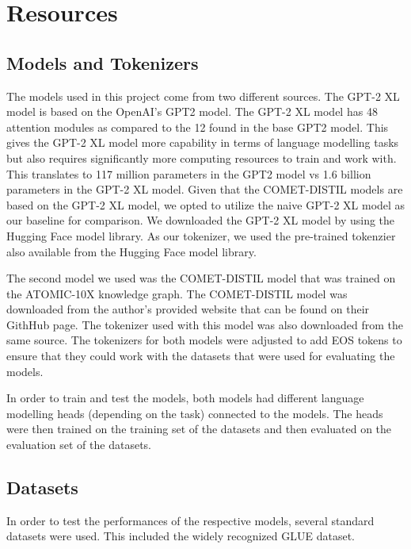 \documentclass[\main/thesis.tex]{subfiles}
\begin{document}
\chapter{Resources}\label{sec:resources} 


\section{Models and Tokenizers}\label{sec:models}

The models used in this project come from two different sources. The GPT-2 XL model is based on the OpenAI's GPT2 
model\cite{radford_language_nodate}. The GPT-2 XL model has 48 attention modules as compared to the 12 found in the base 
GPT2 model. This gives the GPT-2 XL model more capability in terms of language modelling tasks but also requires 
significantly more computing resources to train and work with\cite{noauthor_pretrained_nodate}. This translates to 117 
million parameters in the GPT2 model vs 1.6 billion parameters in the GPT-2 XL model. Given that the COMET-DISTIL models
are based on the GPT-2 XL model, we opted to utilize the naive GPT-2 XL model as our baseline for comparison. We 
downloaded the GPT-2 XL model by using the Hugging Face model library\cite{noauthor_GPT-2 XL_nodate}. As our tokenizer, we 
used the pre-trained tokenzier also available from the Hugging Face model library\cite{noauthor_GPT-2 XL_nodate}. 

The second model we used was the COMET-DISTIL model\cite{west_symbolic_2021} that was trained on the ATOMIC-10X 
knowledge graph. The COMET-DISTIL model was downloaded from the author's provided website that can be found on their 
GithHub page\cite{peterwestai2_symbolic_2022}. The tokenizer used with this model was also downloaded from the same 
source. The tokenizers for both models were adjusted to add EOS tokens to ensure that they could work with the datasets 
that were used for evaluating the models. 

In order to train and test the models, both models had different language modelling heads (depending on the task) 
connected to the models. The heads were then trained on the training set of the datasets and then evaluated on 
the evaluation set of the datasets. 

\section{Datasets}\label{sec:datasets}
In order to test the performances of the respective models, several standard datasets were used. This 
included the widely recognized GLUE dataset\cite{wang_glue_2019}. 
\end{document}
